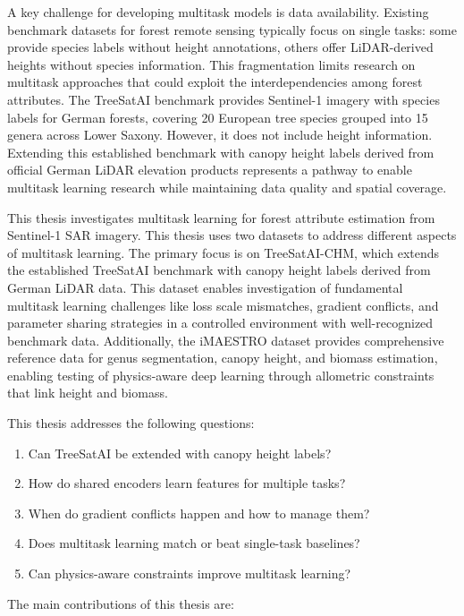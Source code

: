 A key challenge for developing multitask models is data availability. Existing benchmark datasets for forest remote sensing typically focus on single tasks: some provide species labels without height annotations, others offer LiDAR-derived heights without species information. This fragmentation limits research on multitask approaches that could exploit the interdependencies among forest attributes. The TreeSatAI benchmark \cite{ahlswede_treesatai_2023} provides Sentinel-1 imagery with species labels for German forests, covering 20 European tree species grouped into 15 genera across Lower Saxony. However, it does not include height information. Extending this established benchmark with canopy height labels derived from official German LiDAR elevation products represents a pathway to enable multitask learning research while maintaining data quality and spatial coverage.

This thesis investigates multitask learning for forest attribute estimation from Sentinel-1 SAR imagery. This thesis uses two datasets to address different aspects of multitask learning. The primary focus is on TreeSatAI-CHM, which extends the established TreeSatAI benchmark with canopy height labels derived from German LiDAR data. This dataset enables investigation of fundamental multitask learning challenges like loss scale mismatches, gradient conflicts, and parameter sharing strategies in a controlled environment with well-recognized benchmark data. Additionally, the iMAESTRO dataset provides comprehensive reference data for genus segmentation, canopy height, and biomass estimation, enabling testing of physics-aware deep learning through allometric constraints that link height and biomass.

This thesis addresses the following questions:

\begin{enumerate}
    \item Can TreeSatAI be extended with canopy height labels?
    \item How do shared encoders learn features for multiple tasks?
    \item When do gradient conflicts happen and how to manage them?
    \item Does multitask learning match or beat single-task baselines?
    \item Can physics-aware constraints improve multitask learning?
\end{enumerate}

The main contributions of this thesis are:

